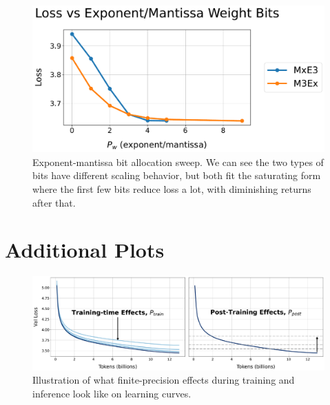 \documentclass[11pt]{article}
\begin{document}
\begin{figure}
    \centering
    \includegraphics[width=0.6\linewidth]{em_sweep.pdf}
    \caption{{Exponent-mantissa bit allocation sweep. We can see the two types of bits have different scaling behavior, but both fit the saturating form where the first few bits reduce loss a lot, with diminishing returns after that.}}
    \label{fig:enter-label}
\end{figure}



\section{Additional Plots}
\label{appdx: plots}

\begin{figure}
    \centering
    \includegraphics[width=\linewidth]{schematic_Dolma.pdf}
    \caption{Illustration of what finite-precision effects during training and inference look like on learning curves. }
    \label{fig:schematic-dolma}
\end{figure}
\end{document}
